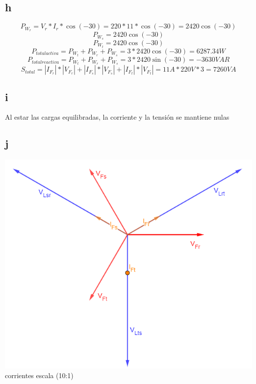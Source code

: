 \documentclass{article}
\begin{document}
\subsection{h}
\begin{equation}
    P_W_r=V_r*I_r*\cos{(-30)}=220*11*\cos{(-30)}=2420\cos{(-30)}
\end{equation}
\begin{equation}
    P_W_s=2420\cos{(-30)}
\end{equation}
\begin{equation}
    P_W_t=2420\cos{(-30)}
\end{equation}
\begin{equation}
    P_{total activa}=P_W_t+P_W_r+P_W_s=3*2420\cos{(-30)}=6287.34W
\end{equation}
\begin{equation}
    P_{total reactiva}=P_W_t+P_W_r+P_W_s=3*2420\sin{(-30)}=-3630VAR
\end{equation}
\begin{equation}
    S_{total}=|I_F_r|*|V_F_r|+|I_F_s|*|V_F_s|+|I_F_t|*|V_F_t|=11A*220V*3=7260VA
\end{equation}
\subsection{i}
Al estar las cargas equilibradas, la corriente y la tensión se mantiene nulas
\subsection{j}
\includegraphics[scale=0.6]{Diagrama_fasorial_1.png}
corrientes escala (10:1)
\end{document}
